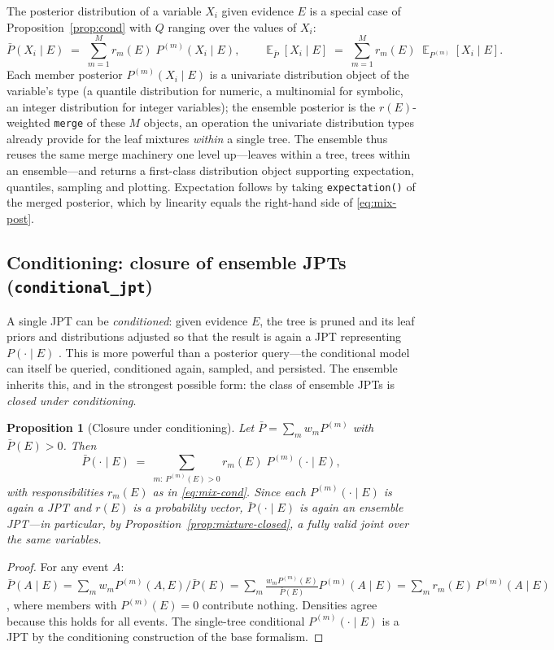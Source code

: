 \documentclass[11pt]{article}
\theoremstyle{plain}
\newtheorem{proposition}[theorem]{Proposition}
\theoremstyle{definition}
\theoremstyle{remark}
\DeclareMathOperator{\E}{\mathbb{E}}
\begin{document}
The posterior distribution of a variable $X_i$ given evidence $E$ is a
special case of Proposition~\ref{prop:cond} with $Q$ ranging over the
values of $X_i$:
\begin{equation}
\label{eq:mix-post}
\bar P(X_i\mid E)\;=\;\sum_{m=1}^M r_m(E)\; P^{(m)}(X_i\mid E),
\qquad
\E_{\bar P}[X_i\mid E]\;=\;\sum_{m=1}^M r_m(E)\;\E_{P^{(m)}}[X_i\mid E].
\end{equation}
Each member posterior $P^{(m)}(X_i\mid E)$ is a univariate distribution
object of the variable's type (a quantile distribution for numeric, a
multinomial for symbolic, an integer distribution for integer variables);
the ensemble posterior is the $r(E)$-weighted \texttt{merge} of these $M$
objects, an operation the univariate distribution types already provide
for the leaf mixtures \emph{within} a single tree. The ensemble thus
reuses the same merge machinery one level up---leaves within a tree,
trees within an ensemble---and returns a first-class distribution object
supporting expectation, quantiles, sampling and plotting. Expectation
follows by taking \texttt{expectation()} of the merged posterior, which
by linearity equals the right-hand side of \eqref{eq:mix-post}.

\subsection{Conditioning: closure of ensemble JPTs
(\texttt{conditional\_jpt})}
\label{sec:closure}

A single JPT can be \emph{conditioned}: given evidence $E$, the tree is
pruned and its leaf priors and distributions adjusted so that the result
is again a JPT representing $P(\cdot\mid E)$ \citep{nyga2023jpt}. This is
more powerful than a posterior query---the conditional model can itself
be queried, conditioned again, sampled, and persisted. The ensemble
inherits this, and in the strongest possible form: the class of ensemble
JPTs is \emph{closed under conditioning}.

\begin{proposition}[Closure under conditioning]
\label{prop:closure}
Let $\bar P=\sum_m w_m P^{(m)}$ with $\bar P(E)>0$. Then
\begin{equation}
\label{eq:mix-condjpt}
\bar P(\cdot\mid E)\;=\;\sum_{m:\,P^{(m)}(E)>0} r_m(E)\;
P^{(m)}(\cdot\mid E),
\end{equation}
with responsibilities $r_m(E)$ as in \eqref{eq:mix-cond}. Since each
$P^{(m)}(\cdot\mid E)$ is again a JPT and $r(E)$ is a probability
vector, $\bar P(\cdot\mid E)$ is again an ensemble JPT---in particular,
by Proposition~\ref{prop:mixture-closed}, a fully valid joint over the
same variables.
\end{proposition}
\begin{proof}
For any event $A$:
$\bar P(A\mid E)=\sum_m w_m P^{(m)}(A,E)/\bar P(E)
=\sum_m \frac{w_m P^{(m)}(E)}{\bar P(E)} P^{(m)}(A\mid E)
=\sum_m r_m(E)\,P^{(m)}(A\mid E)$, where members with $P^{(m)}(E)=0$
contribute nothing. Densities agree because this holds for all events.
The single-tree conditional $P^{(m)}(\cdot\mid E)$ is a JPT by the
conditioning construction of the base formalism.
\end{proof}
\end{document}
